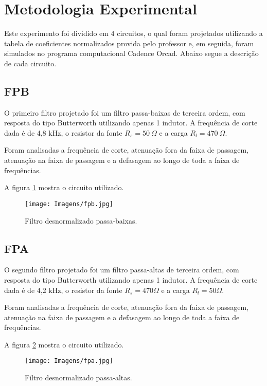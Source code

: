 
\newpage

\section{Metodologia Experimental}

Este experimento foi dividido em 4 circuitos, o qual foram projetados utilizando a tabela de coeficientes normalizados provida pelo professor e, em seguida, foram simulados no programa computacional Cadence Orcad. Abaixo segue a descrição de cada circuito.

\subsection{FPB}
O primeiro filtro projetado foi um filtro passa-baixas de terceira ordem, com resposta do tipo Butterworth utilizando apenas 1 indutor. A frequência de corte dada é de 4,8 kHz, o resistor da fonte $R_s = 50\ \Omega$ e a carga $R_l = 470\ \Omega$.

Foram analisadas a frequência de corte, atenuação fora da faixa de passagem, atenuação na faixa de passagem e a defasagem ao longo de toda a faixa de frequências.

A figura \ref{fFPB} mostra o circuito utilizado.\begin{figure}[H]
    \centering
    
    \texttt{[image: Imagens/fpb.jpg]}
    \label{fFPB}
    \caption{Filtro desnormalizado passa-baixas.}
\end{figure}



\subsection{FPA}
O segundo filtro projetado foi um filtro passa-altas de terceira ordem, com resposta do tipo Butterworth utilizando apenas 1 indutor. A frequência de corte dada é de 4,2 kHz, o resistor da fonte $R_s = 470 \Omega$ e a carga $R_l = 50 \Omega$.

Foram analisadas a frequência de corte, atenuação fora da faixa de passagem, atenuação na faixa de passagem e a defasagem ao longo de toda a faixa de frequências.

A figura \ref{fFPA} mostra o circuito utilizado.\begin{figure}[H]
    \centering
    \texttt{[image: Imagens/fpa.jpg]}
    \label{fFPA}
    \caption{Filtro desnormalizado passa-altas.}
\end{figure}

